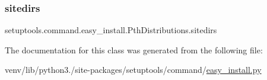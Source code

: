 \subsubsection{\texorpdfstring{sitedirs}{sitedirs}}
{\footnotesize\ttfamily setuptools.\+command.\+easy\+\_\+install.\+Pth\+Distributions.\+sitedirs}



The documentation for this class was generated from the following file\+:\begin{DoxyCompactItemize}
\item 
venv/lib/python3./site-\/packages/setuptools/command/\hyperlink{easy__install_8py}{easy\+\_\+install.\+py}\end{DoxyCompactItemize}
